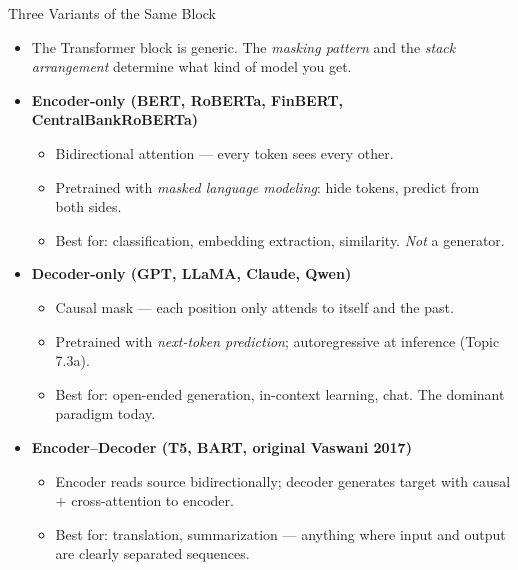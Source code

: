 \begin{frame}{Three Variants of the Same Block}
\begin{itemize}
\item The Transformer block is generic. The \emph{masking pattern} and the \emph{stack arrangement} determine what kind of model you get.

\medskip
\item \textbf{Encoder-only (BERT, RoBERTa, FinBERT, CentralBankRoBERTa)}
\begin{itemize}
    \item Bidirectional attention --- every token sees every other.
    \item Pretrained with \emph{masked language modeling}: hide tokens, predict from both sides.
    \item Best for: classification, embedding extraction, similarity. \emph{Not} a generator.
\end{itemize}

\medskip
\item \textbf{Decoder-only (GPT, LLaMA, Claude, Qwen)}
\begin{itemize}
    \item Causal mask --- each position only attends to itself and the past.
    \item Pretrained with \emph{next-token prediction}; autoregressive at inference (Topic 7.3a).
    \item Best for: open-ended generation, in-context learning, chat. The dominant paradigm today.
\end{itemize}

\medskip
\item \textbf{Encoder--Decoder (T5, BART, original Vaswani 2017)}
\begin{itemize}
    \item Encoder reads source bidirectionally; decoder generates target with causal $+$ cross-attention to encoder.
    \item Best for: translation, summarization --- anything where input and output are clearly separated sequences.
\end{itemize}
\end{itemize}
\end{frame}


